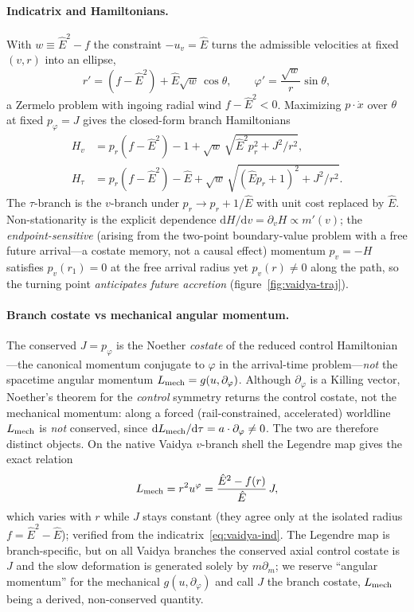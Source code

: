 \documentclass[12pt]{iopart}
\newcommand{\Ehat}{\hat E}
\newcommand{\dd}{\mathrm{d}}
\begin{document}
\paragraph{Indicatrix and Hamiltonians.} With $w\equiv\Ehat^2-f$ the constraint
$-u_v=\Ehat$ turns the admissible velocities at fixed $(v,r)$ into an ellipse,
\begin{equation}
    r'=(f-\Ehat^2)+\Ehat\sqrt w\,\cos\theta,\qquad
    \varphi'=\frac{\sqrt w}{r}\sin\theta,
    \label{eq:vaidya-ind}
\end{equation}
a Zermelo problem with ingoing radial wind $f-\Ehat^2<0$. Maximizing
$p\cdot\dot x$ over $\theta$ at fixed $p_\varphi=J$ gives the closed-form branch
Hamiltonians
\begin{align}
    H_v&=p_r(f-\Ehat^2)-1+\sqrt w\,\sqrt{\Ehat^2 p_r^2+J^2/r^2},
    \label{eq:Hv}\\
    H_\tau&=p_r(f-\Ehat^2)-\Ehat
        +\sqrt w\,\sqrt{(\Ehat p_r+1)^2+J^2/r^2}.
    \label{eq:Htau-vaidya}
\end{align}
The $\tau$-branch is the $v$-branch under $p_r\to p_r+1/\Ehat$ with unit cost
replaced by $\Ehat$. Non-stationarity is the explicit dependence
$\dd H/\dd v=\partial_v H\propto m'(v)$; the \emph{endpoint-sensitive} (arising from the
two-point boundary-value problem with a free future arrival---a costate memory, not a
causal effect) momentum $p_v=-H$
satisfies $p_v(r_1)=0$ at the free arrival radius yet $p_v(r)\neq0$ along the
path, so the turning point \emph{anticipates future accretion}
(figure~\ref{fig:vaidya-traj}).

\paragraph{Branch costate vs mechanical angular momentum.} The conserved $J=p_\varphi$
is the Noether \emph{costate} of the reduced control Hamiltonian---the canonical
momentum conjugate to $\varphi$ in the arrival-time problem---\emph{not} the spacetime
angular momentum $L_{\rm mech}=g(u,\partial_\varphi)$. Although $\partial_\varphi$ is a
Killing vector, Noether's theorem for the \emph{control} symmetry returns the control
costate, not the mechanical momentum: along a forced (rail-constrained, accelerated)
worldline $L_{\rm mech}$ is \emph{not} conserved, since
$\dd L_{\rm mech}/\dd\tau=a\cdot\partial_\varphi\neq0$. The two are therefore distinct
objects. On the native Vaidya $v$-branch shell the Legendre map gives the exact
relation
\begin{equation}
    L_{\rm mech}=r^2 u^\varphi=\frac{\Ehat^2-f(r)}{\Ehat}\,J,
    \label{eq:costate-mech}
\end{equation}
which varies with $r$ while $J$ stays constant (they agree only at the isolated radius
$f=\Ehat^2-\Ehat$); verified from the indicatrix~\eqref{eq:vaidya-ind}. The Legendre
map is branch-specific, but on all Vaidya branches the conserved axial control costate is
$J$ and the slow deformation is generated solely by $m\partial_m$; we reserve ``angular
momentum'' for the mechanical $g(u,\partial_\varphi)$ and call $J$ the branch costate,
$L_{\rm mech}$ being a derived, non-conserved quantity.
\end{document}
